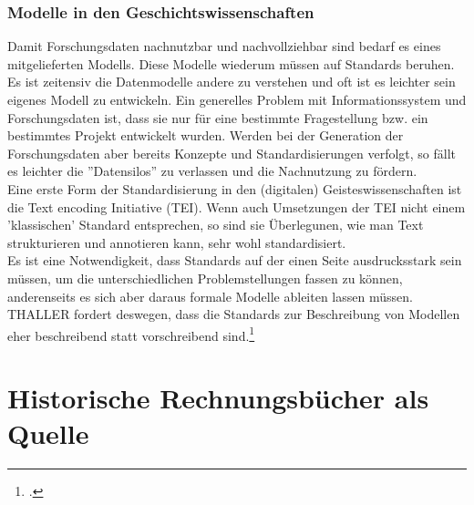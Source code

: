 \documentclass[12pt,a4paper]{article}
\begin{document}
\subsubsection{Modelle in den Geschichtswissenschaften}

Damit Forschungsdaten nachnutzbar und nachvollziehbar sind bedarf es eines mitgelieferten Modells. Diese Modelle wiederum müssen auf Standards beruhen. Es ist zeitensiv die Datenmodelle andere zu verstehen und oft ist es leichter sein eigenes Modell zu entwickeln. Ein generelles Problem mit Informationssystem und Forschungsdaten ist, dass sie nur für eine bestimmte Fragestellung bzw. ein bestimmtes Projekt entwickelt wurden. Werden bei der Generation der Forschungsdaten aber bereits Konzepte und Standardisierungen verfolgt, so fällt es leichter die ''Datensilos'' zu verlassen und die Nachnutzung zu fördern. 
\\
Eine erste Form der Standardisierung in den (digitalen) Geisteswissenschaften ist die Text encoding Initiative (TEI). Wenn auch Umsetzungen der TEI nicht einem 'klassischen' Standard entsprechen, so sind sie Überlegunen, wie man Text strukturieren und annotieren kann, sehr wohl standardisiert. 
\\
Es ist eine Notwendigkeit, dass Standards auf der einen Seite ausdrucksstark sein müssen, um die unterschiedlichen Problemstellungen fassen zu können, anderenseits es sich aber daraus formale Modelle ableiten lassen müssen. THALLER fordert deswegen, dass die Standards zur Beschreibung von Modellen eher beschreibend statt  vorschreibend sind.\footcite[][S.204]{thaller2017need}


\section{Historische Rechnungsbücher als Quelle}
\label{Rechnung}
\end{document}
